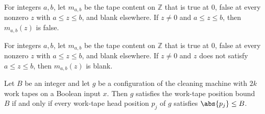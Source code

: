 \begin{lemma}
\label{Complexity.LogProg.markI_of_mem}
\leanok
{}
For integers $a,b$, let $m_{a,b}$ be the tape content on $\mathbb{Z}$ that is true at
$0$, false at every nonzero $z$ with $a\le z\le b$, and blank elsewhere. If $z\ne 0$ and
$a\le z\le b$, then $m_{a,b}(z)$ is false.
\end{lemma}

\begin{lemma}
\label{Complexity.LogProg.markI_of_not_mem}
\leanok
{}
For integers $a,b$, let $m_{a,b}$ be the tape content on $\mathbb{Z}$ that is true at
$0$, false at every nonzero $z$ with $a\le z\le b$, and blank elsewhere. If $z\ne 0$ and
$z$ does not satisfy $a\le z\le b$, then $m_{a,b}(z)$ is blank.
\end{lemma}

\begin{lemma}
\label{Complexity.LogProg.PB_iff}
\leanok
{}
Let $B$ be an integer and let $g$ be a configuration of the cleaning machine with $2k$
work tapes on a Boolean input $x$. Then $g$ satisfies the work-tape position bound $B$
if and only if every work-tape head position $p_j$ of $g$ satisfies $\abs{p_j}\le B$.
\end{lemma}
